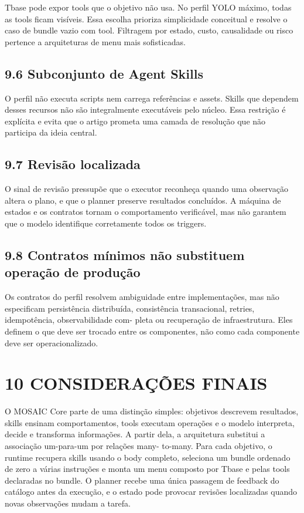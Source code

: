 \documentclass[12pt,a4paper]{article}
\begin{document}
Tbase pode expor tools que o objetivo não usa. No perfil YOLO máximo, todas as tools ficam visíveis. Essa escolha prioriza simplicidade conceitual e resolve o caso de bundle vazio com tool. Filtragem por estado, custo, causalidade ou risco pertence a arquiteturas de menu mais sofisticadas.



\subsection*{9.6 Subconjunto de Agent Skills}

O perfil não executa scripts nem carrega referências e assets. Skills que dependem desses recursos não são integralmente executáveis pelo núcleo. Essa restrição é explícita e evita que o artigo prometa uma camada de resolução que não participa da ideia central.


\subsection*{9.7 Revisão localizada}

O sinal de revisão pressupõe que o executor reconheça quando uma observação altera o plano, e que o planner preserve resultados concluídos. A máquina de estados e os contratos tornam o comportamento verificável, mas não garantem que o modelo identifique corretamente todos os triggers.


\subsection*{9.8 Contratos mínimos não substituem operação de produção}

Os contratos do perfil resolvem ambiguidade entre implementações, mas não especificam persistência distribuída, consistência transacional, retries, idempotência, observabilidade com- pleta ou recuperação de infraestrutura. Eles definem o que deve ser trocado entre os componentes, não como cada componente deve ser operacionalizado.


\section*{10 CONSIDERAÇÕES FINAIS}

O MOSAIC Core parte de uma distinção simples: objetivos descrevem resultados, skills ensinam comportamentos, tools executam operações e o modelo interpreta, decide e transforma informações. A partir dela, a arquitetura substitui a associação um-para-um por relações many- to-many. Para cada objetivo, o runtime recupera skills usando o body completo, seleciona um bundle ordenado de zero a várias instruções e monta um menu composto por Tbase e pelas tools declaradas no bundle. O planner recebe uma única passagem de feedback do catálogo antes da execução, e o estado pode provocar revisões localizadas quando novas observações mudam a tarefa.
\end{document}
